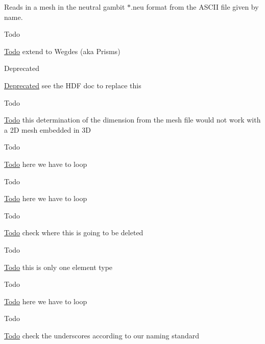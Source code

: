 Reads in a mesh in the neutral gambit $\ast$.neu format from the A\+S\+C\+II file given by name.

\begin{DoxyRefDesc}{Todo}
\item[\mbox{\hyperlink{todo__todo000004}{Todo}}]extend to Wegdes (aka Prisms) \end{DoxyRefDesc}
\begin{DoxyRefDesc}{Deprecated}
\item[\mbox{\hyperlink{deprecated__deprecated000020}{Deprecated}}]see the H\+DF doc to replace this \end{DoxyRefDesc}


\begin{DoxyRefDesc}{Todo}
\item[\mbox{\hyperlink{todo__todo000005}{Todo}}]this determination of the dimension from the mesh file would not work with a 2D mesh embedded in 3D \end{DoxyRefDesc}


\begin{DoxyRefDesc}{Todo}
\item[\mbox{\hyperlink{todo__todo000006}{Todo}}]here we have to loop \end{DoxyRefDesc}


\begin{DoxyRefDesc}{Todo}
\item[\mbox{\hyperlink{todo__todo000007}{Todo}}]here we have to loop \end{DoxyRefDesc}


\begin{DoxyRefDesc}{Todo}
\item[\mbox{\hyperlink{todo__todo000008}{Todo}}]check where this is going to be deleted \end{DoxyRefDesc}


\begin{DoxyRefDesc}{Todo}
\item[\mbox{\hyperlink{todo__todo000009}{Todo}}]this is only one element type \end{DoxyRefDesc}


\begin{DoxyRefDesc}{Todo}
\item[\mbox{\hyperlink{todo__todo000010}{Todo}}]here we have to loop \end{DoxyRefDesc}


\begin{DoxyRefDesc}{Todo}
\item[\mbox{\hyperlink{todo__todo000011}{Todo}}]check the underscores according to our naming standard \end{DoxyRefDesc}


